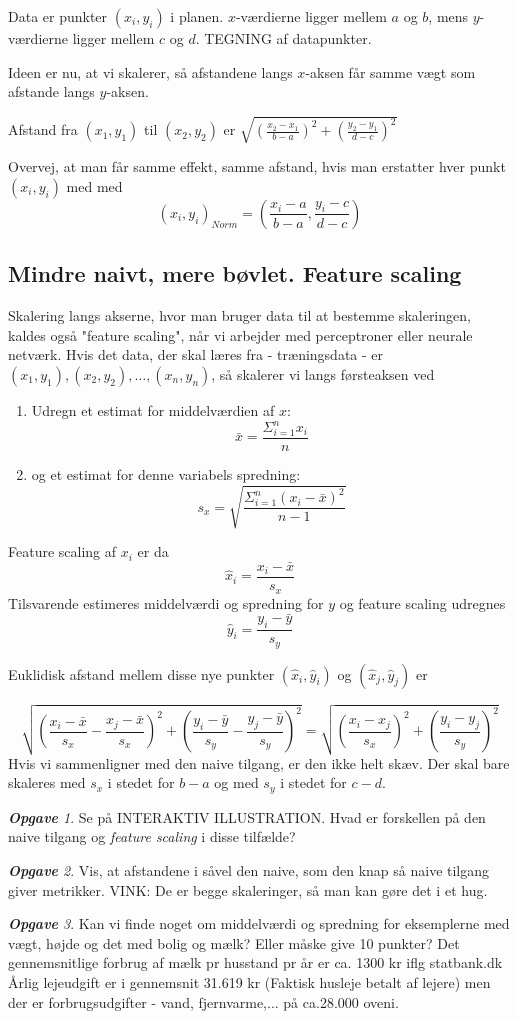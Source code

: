 \documentclass[a4paper, 12pt]{article}
\theoremstyle{remark}
\newtheorem{Opgave}{\textbf{Opgave}}
\begin{document}
Data er punkter $(x_i,y_i)$ i planen. $x$-værdierne ligger mellem $a$ og $b$, mens $y$-værdierne ligger mellem $c$ og $d$. TEGNING af datapunkter.

Ideen er nu, at vi skalerer, så afstandene langs $x$-aksen får samme vægt som afstande langs $y$-aksen. 

Afstand fra $(x_1,y_1)$ til $(x_2,y_2)$ er $\sqrt{(\frac{x_2-x_1}{b-a})^2+(\frac{y_2-y_1}{d-c})^2}$

Overvej, at man får samme effekt, samme afstand, hvis man erstatter hver punkt $(x_i,y_i)$ med med $$(x_i,y_i)_{Norm}=\left(\frac{x_i-a}{b-a}, \frac{y_i-c}{d-c}\right)$$

\subsection*{Mindre naivt, mere bøvlet. Feature scaling}
Skalering langs akserne, hvor man bruger data til at bestemme skaleringen, kaldes også "feature scaling", når vi arbejder med perceptroner eller neurale netværk. Hvis det data, der skal læres fra - træningsdata - er $(x_1,y_1), (x_2,y_2),\ldots, (x_n,y_n)$, så skalerer vi langs førsteaksen ved
\begin{enumerate}
\item Udregn et estimat for middelværdien af $x$:
$$\bar{x}=\frac{\Sigma_{i=1}^nx_i}{n}$$
\item og et estimat for denne variabels spredning:
$$s_x=\sqrt{\frac{\Sigma_{i=1}^n(x_i-\bar{x})^2}{n-1}}$$
\end{enumerate}
Feature scaling af $x_i$ er da
$$\hat{x}_i=\frac{x_i-\bar{x}}{s_x}$$
Tilsvarende estimeres middelværdi og spredning for $y$ og feature scaling udregnes 
$$\hat{y}_i= \frac{y_i-\bar{y}}{s_y}$$

Euklidisk afstand mellem disse nye punkter $(\hat{x}_i,\hat{y}_i)$ og  $(\hat{x}_j,\hat{y}_j)$ er 

$$\sqrt{\left(\frac{x_i-\bar{x}}{s_x}-\frac{x_j-\bar{x}}{s_x}\right)^2 +\left(\frac{y_i-\bar{y}}{s_y}-\frac{y_j-\bar{y}}{s_y}\right)^2}=\sqrt{\left(\frac{x_i-x_j}{s_x}\right)^2+\left(\frac{y_i-y_j}{s_y}\right)^2}$$
Hvis vi sammenligner med den naive tilgang, er den ikke helt skæv. Der skal bare skaleres med $s_x$ i stedet for $b-a$ og med $s_y$ i stedet for $c-d$.
\begin{Opgave}
Se på INTERAKTIV ILLUSTRATION. Hvad er forskellen på den naive tilgang og \emph{feature scaling} i disse tilfælde? 
\end{Opgave}
\begin{Opgave}
Vis, at afstandene i såvel den naive, som den knap så naive tilgang giver metrikker. VINK: De er begge skaleringer, så man kan gøre det i et hug. 
\end{Opgave}
\begin{Opgave} Kan vi finde noget om middelværdi og spredning for eksemplerne med vægt, højde og det med bolig og mælk? Eller måske give 10 punkter? 
Det gennemsnitlige forbrug af mælk pr husstand pr år er ca. 1300 kr iflg statbank.dk Årlig lejeudgift er i gennemsnit 31.619 kr (Faktisk husleje betalt af lejere) men der er forbrugsudgifter - vand, fjernvarme,... på ca.28.000 oveni. 
\end{Opgave}
\end{document}
